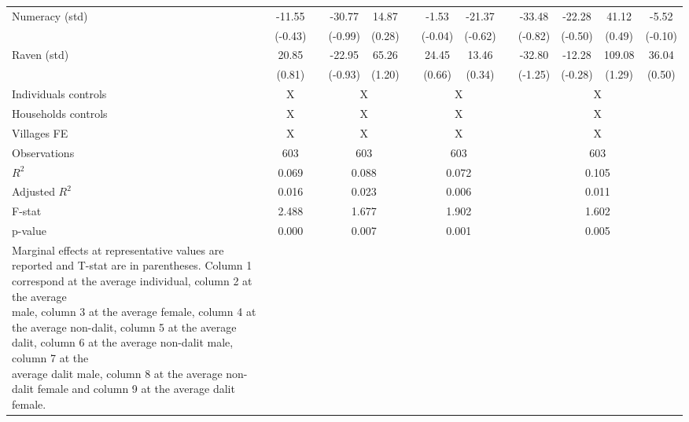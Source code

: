 \begin{table}[!h]
{\begin{tabular}{lcccccccccccc}
    Numeracy (std) & -11.55 &   & -30.77 & 14.87 &   & -1.53 & -21.37 &   & -33.48 & -22.28 & 41.12 & -5.52 \\
      & (-0.43) &   & (-0.99) & (0.28) &   & (-0.04) & (-0.62) &   & (-0.82) & (-0.50) & (0.49) & (-0.10) \\
    Raven (std) & 20.85 &   & -22.95 & 65.26 &   & 24.45 & 13.46 &   & -32.80 & -12.28 & 109.08 & 36.04 \\
      & (0.81) &   & (-0.93) & (1.20) &   & (0.66) & (0.34) &   & (-1.25) & (-0.28) & (1.29) & (0.50) \\
\cmidrule{1-2}\cmidrule{4-5}\cmidrule{7-8}\cmidrule{10-13}   
    Individuals controls & X     &       & \multicolumn{2}{c}{X} &       & \multicolumn{2}{c}{X} &       & \multicolumn{4}{c}{X} \\
    Households controls & X     &       & \multicolumn{2}{c}{X} &       & \multicolumn{2}{c}{X} &       & \multicolumn{4}{c}{X} \\
    Villages FE & X     &       & \multicolumn{2}{c}{X} &       & \multicolumn{2}{c}{X} &       & \multicolumn{4}{c}{X} \\
    \midrule
    Observations & 603   &       & \multicolumn{2}{c}{603} &       & \multicolumn{2}{c}{603} &       & \multicolumn{4}{c}{603} \\
    $R^2$ & 0.069 &       & \multicolumn{2}{c}{0.088} &       & \multicolumn{2}{c}{0.072} &       & \multicolumn{4}{c}{0.105} \\
    Adjusted $R^2$ & 0.016 &       & \multicolumn{2}{c}{0.023} &       & \multicolumn{2}{c}{0.006} &       & \multicolumn{4}{c}{0.011} \\
    F-stat & 2.488 &       & \multicolumn{2}{c}{1.677} &       & \multicolumn{2}{c}{1.902} &       & \multicolumn{4}{c}{1.602} \\
    p-value & 0.000 &       & \multicolumn{2}{c}{0.007} &       & \multicolumn{2}{c}{0.001} &       & \multicolumn{4}{c}{0.005} \\
    \bottomrule
	\Tablenote{13}{
	Marginal effects at representative values are reported and T-stat are in parentheses. Column 1 correspond at the average individual, column 2 at the average \\ 
	male, column 3 at the average female, column 4 at the average non-dalit, column 5 at the average dalit, column 6 at the average non-dalit male, column 7 at the \\ 
	average dalit male, column 8 at the average non-dalit female and column 9 at the average dalit female.} \\
    \end{tabular}%
	}
  \label{tab:ame_idsr}%
\end{table}%

